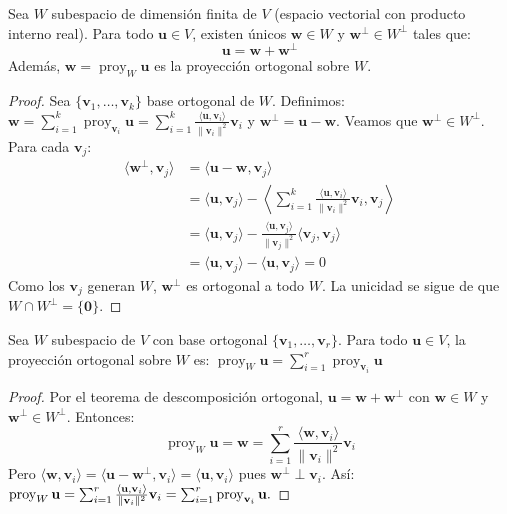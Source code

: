 \begin{theorem}
Sea $W$ subespacio de dimensión finita de $V$ (espacio vectorial con producto interno real). Para todo $\mathbf{u} \in V$, existen únicos $\mathbf{w} \in W$ y $\mathbf{w}^\perp \in W^\perp$ tales que:
\[
\mathbf{u} = \mathbf{w} + \mathbf{w}^\perp
\]
Además, $\mathbf{w} = \operatorname{proy}_W \mathbf{u}$ es la proyección ortogonal sobre $W$.
\end{theorem}

\begin{proof}
Sea $\{ \mathbf{v}_1, \dots, \mathbf{v}_k \}$ base ortogonal de $W$. Definimos: \(
\mathbf{w} = \sum_{i=1}^k \operatorname{proy}_{\mathbf{v}_i} \mathbf{u} = \sum_{i=1}^k \frac{\langle \mathbf{u}, \mathbf{v}_i \rangle}{\|\mathbf{v}_i\|^2} \mathbf{v}_i
\) 
y $\mathbf{w}^\perp = \mathbf{u} - \mathbf{w}$. Veamos que $\mathbf{w}^\perp \in W^\perp$. Para cada $\mathbf{v}_j$:
\begin{align*}
\langle \mathbf{w}^\perp, \mathbf{v}_j \rangle &= \langle \mathbf{u} - \mathbf{w}, \mathbf{v}_j \rangle \\
&= \langle \mathbf{u}, \mathbf{v}_j \rangle - \left\langle \sum_{i=1}^k \frac{\langle \mathbf{u}, \mathbf{v}_i \rangle}{\|\mathbf{v}_i\|^2} \mathbf{v}_i, \mathbf{v}_j \right\rangle \\
&= \langle \mathbf{u}, \mathbf{v}_j \rangle - \frac{\langle \mathbf{u}, \mathbf{v}_j \rangle}{\|\mathbf{v}_j\|^2} \langle \mathbf{v}_j, \mathbf{v}_j \rangle \\
&= \langle \mathbf{u}, \mathbf{v}_j \rangle - \langle \mathbf{u}, \mathbf{v}_j \rangle = 0
\end{align*}
Como los $\mathbf{v}_j$ generan $W$, $\mathbf{w}^\perp$ es ortogonal a todo $W$. La unicidad se sigue de que $W \cap W^\perp = \{\mathbf{0}\}$.
\end{proof}

\begin{theorem}\label{teodeo}
Sea $W$ subespacio de $V$ con base ortogonal $\{ \mathbf{v}_1, \dots, \mathbf{v}_r \}$. Para todo $\mathbf{u} \in V$, la proyección ortogonal sobre $W$ es: \(
\operatorname{proy}_W \mathbf{u} = \sum_{i=1}^r \operatorname{proy}_{\mathbf{v}_i} \mathbf{u}\)
\begin{proof}
Por el teorema de descomposición ortogonal, $\mathbf{u} = \mathbf{w} + \mathbf{w}^\perp$ con $\mathbf{w} \in W$ y $\mathbf{w}^\perp \in W^\perp$. Entonces:
\[
\operatorname{proy}_W \mathbf{u} = \mathbf{w} = \sum_{i=1}^r \frac{\langle \mathbf{w}, \mathbf{v}_i \rangle}{\|\mathbf{v}_i\|^2} \mathbf{v}_i
\]
Pero $\langle \mathbf{w}, \mathbf{v}_i \rangle = \langle \mathbf{u} - \mathbf{w}^\perp, \mathbf{v}_i \rangle = \langle \mathbf{u}, \mathbf{v}_i \rangle$ pues $\mathbf{w}^\perp \perp \mathbf{v}_i$. Así: \(
\operatorname{proy}_W \mathbf{u} = \sum_{i=1}^r \frac{\langle \mathbf{u}, \mathbf{v}_i \rangle}{\|\mathbf{v}_i\|^2} \mathbf{v}_i = \sum_{i=1}^r \operatorname{proy}_{\mathbf{v}_i} \mathbf{u}. \qedhere \)
\end{proof}
\end{theorem}

